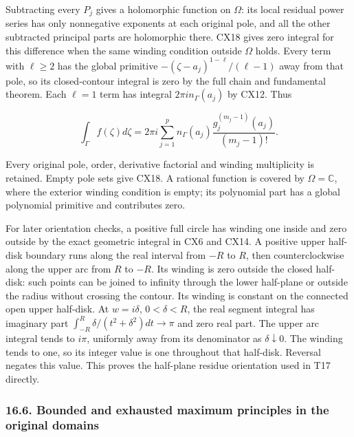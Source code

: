 \documentclass[
  11pt,
]{article}
\makeatletter
\let\ReaderOriginalAnchorStart\hyper@anchorstart
\let\ReaderOriginalAnchorEnd\hyper@anchorend
\let\ReaderPendingAliases\@empty
\def\ReaderArmAliases#1{\gdef\ReaderPendingAliases{#1}}
\def\hyper@anchorstart#1{\ReaderIfNativeAnchorTF{#1}{\ReaderPendingAliases\global\let\ReaderPendingAliases\@empty}{}\ReaderOriginalAnchorStart{#1}}
\makeatother
\begin{document}
Subtracting every \(P_j\) gives a holomorphic function on \(\Omega\):
its local residual power series has only nonnegative exponents at each
original pole, and all the other subtracted principal parts are
holomorphic there. CX18 gives zero integral for this difference when the
same winding condition outside \(\Omega\) holds. Every term with
\(\ell\geq2\) has the global primitive
\(-(\zeta-a_j)^{1-\ell}/(\ell-1)\) away from that pole, so its
closed-contour integral is zero by the full chain and fundamental
theorem. Each \(\ell=1\) term has integral \(2\pi i n_\Gamma(a_j)\) by
CX12. Thus

\[
\int_\Gamma f(\zeta)d\zeta
 =2\pi i\sum_{j=1}^p n_\Gamma(a_j)
                  \frac{g_j^{(m_j-1)}(a_j)}{(m_j-1)!}.
\tag{CX20}
\]

Every original pole, order, derivative factorial and winding
multiplicity is retained. Empty pole sets give CX18. A rational function
is covered by \(\Omega=\mathbb C\), where the exterior winding condition
is empty; its polynomial part has a global polynomial primitive and
contributes zero.

For later orientation checks, a positive full circle has winding one
inside and zero outside by the exact geometric integral in CX6 and CX14.
A positive upper half-disk boundary runs along the real interval from
\(-R\) to \(R\), then counterclockwise along the upper arc from \(R\) to
\(-R\). Its winding is zero outside the closed half-disk: such points
can be joined to infinity through the lower half-plane or outside the
radius without crossing the contour. Its winding is constant on the
connected open upper half-disk. At \(w=i\delta\), \(0<\delta<R\), the
real segment integral has imaginary part
\(\int_{-R}^R\delta/(t^2+\delta^2)dt\to\pi\) and zero real part. The
upper arc integral tends to \(i\pi\), uniformly away from its
denominator as \(\delta\downarrow0\). The winding tends to one, so its
integer value is one throughout that half-disk. Reversal negates this
value. This proves the half-plane residue orientation used in T17
directly.

\ReaderArmAliases{\ReaderOriginalAnchorStart{AN03-CN-COMPLEX-006}\ReaderOriginalAnchorEnd\begingroup\expandafter\def\csname @currentHref\endcsname{AN03-CN-COMPLEX-006}\label{AN03-CN-COMPLEX-006}\endgroup\ReaderOriginalAnchorStart{bounded-and-exhausted-maximum-principles-in-the-original-domains}\ReaderOriginalAnchorEnd}
\subsubsection{16.6. Bounded and exhausted maximum principles in the
original
domains}\label{bounded-and-exhausted-maximum-principles-in-the-original-domains}
\end{document}
